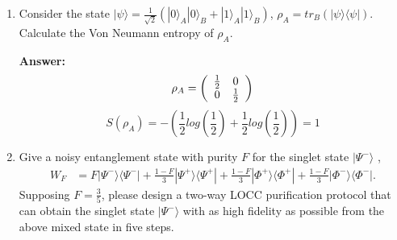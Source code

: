 \documentclass[english,aps,onecolumn]{revtex4-1}
\begin{document}
\begin{enumerate}[1.]
\item
	Consider the state $|\psi\rangle = \frac{1}{\sqrt{2}}(|0\rangle_A|0\rangle_B + |1\rangle_A|1\rangle_B)$, $\rho_A = tr_B(|\psi\rangle\langle\psi|)$. Calculate the Von Neumann entropy of $\rho_A$.

	\textbf{Answer:}\\
	\begin{equation}
	\rho_A = \left(
                                                          \begin{array}{cc}
                                                            \frac{1}{2} & 0 \\
                                                            0 & \frac{1}{2} \\
                                                          \end{array}
                                                           \right)   \notag
    \end{equation}
    $$S(\rho_A) = -(\frac{1}{2} log(\frac{1}{2}) + \frac{1}{2} log(\frac{1}{2}) )= 1$$


\item
  Give a noisy entanglement state with purity $F$ for the singlet state $|\Psi^-\rangle$ ,
  \begin{align*}
     W_F&= F|\Psi^-\rangle\langle\Psi^-|+\frac{1-F}{3}|\Psi^+\rangle\langle\Psi^+| +\frac{1-F}{3}|\Phi^+\rangle\langle\Phi^+|+\frac{1-F}{3}|\Phi^-\rangle\langle\Phi^-| .
    \end{align*}
Supposing $F=\frac{3}{5}$, please design a two-way LOCC purification protocol that can obtain the singlet state $|\Psi^-\rangle$ with as high fidelity as possible from the above mixed state in five steps.


\end{enumerate}
\end{document}
